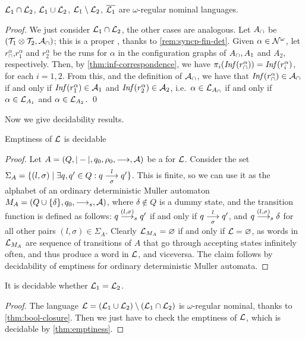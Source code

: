 \begin{theorem}
$\mathcal{L}_1 \cap \mathcal{L}_2$, $\mathcal{L}_1 \cup \mathcal{L}_2$, $\mathcal{L}_1 \setminus \mathcal{L}_2$, $\overline{\mathcal{L}_1}$ are $\omega$-regular nominal languages.
\label{thm:bool-closure}
\end{theorem}
%
\begin{proof}
We just consider $\mathcal{L}_1 \cap \mathcal{L}_2$, the other cases are analogous. Let $A_\cap$ be $(\mathcal{T}_1 \otimes \mathcal{T}_2,\mathcal{A}_\cap)$; this is a proper \hdma{}, thanks to \cref{rem:syncp-fin-det}. Given $\alpha \in \mathcal{N}^\omega$, let $r^\alpha_\cap$,$r_1^\alpha$ and $r_2^\alpha$ be the runs for $\alpha$ in the configuration graphs of $A_\cap,A_1$ and $A_2$, respectively. Then, by \cref{thm:inf-correspondence}, we have $\pi_i(\mathit{Inf}(r^\alpha_\cap)) = \mathit{Inf}(r^\alpha_i)$, for each $i=1,2$. From this, and the definition of $\mathcal{A}_\cap$, we have that $\mathit{Inf}(r^\alpha_\cap) \in \mathcal{A}_\cap$ if and only if $\mathit{Inf}(r^\alpha_1) \in \mathcal{A}_1$ and $\mathit{Inf}(r^\alpha_2) \in \mathcal{A}_2$, i.e.\ $\alpha \in \mathcal{L}_{A_\cap}$ if and only if $\alpha \in \mathcal{L}_{A_1}$ and $\alpha \in\mathcal{L}_{A_2}$.
\qed
\end{proof}
%
Now we give decidability results.
%
\begin{theorem}
Emptiness of $\mathcal{L}$ is decidable
\label{thm:emptiness}
\end{theorem}
\begin{proof}
Let $A = (Q,|-|,q_0,\rho_0,\overset{}{\underset{}{\longrightarrow}},\mathcal{A})$ be a \hdma{} for $\mathcal{L}$. Consider the set $\Sigma_A = \{ (l,\sigma) \mid \exists q,q' \in Q : q \overset{l}{\underset{\sigma}{\longrightarrow}} q' \}$. This is finite, so we can use it as the alphabet of an ordinary deterministic Muller automaton $M_A = (Q \cup \{\delta\}, q_0,\overset{}{\longrightarrow}_s,\mathcal{A})$, where $\delta \notin Q$ is a dummy state, and the transition function is defined as follows: $q \overset{(l,\sigma)}{\longrightarrow}_s q'$ if and only if $q \overset{l}{\underset{\sigma}{\longrightarrow}} q'$, and $q \overset{(l,\sigma)}{\longrightarrow}_s \delta$ for all other pairs $(l,\sigma) \in \Sigma_A$. Clearly $\mathcal{L}_{M_A} = \varnothing$ if and only if $\mathcal{L} = \varnothing$, as words in $\mathcal{L}_{M_A}$ are sequence of transitions of $A$ that go through accepting states infinitely often, and thus produce a word in $\mathcal{L}$, and viceversa. The claim follows by decidability of emptiness for ordinary deterministic Muller automata.
\end{proof}

\begin{theorem}
It is decidable whether $\mathcal{L}_1 = \mathcal{L}_2$.
\end{theorem}

\begin{proof}
The language $\mathcal{L} = (\mathcal{L}_1 \cup \mathcal{L}_2) \setminus (\mathcal{L}_1 \cap \mathcal{L}_2 )$ is $\omega$-regular nominal, thanks to \cref{thm:bool-closure}. Then we just have to check the emptiness of $\mathcal{L}$, which is decidable by \cref{thm:emptiness}.
\end{proof}
